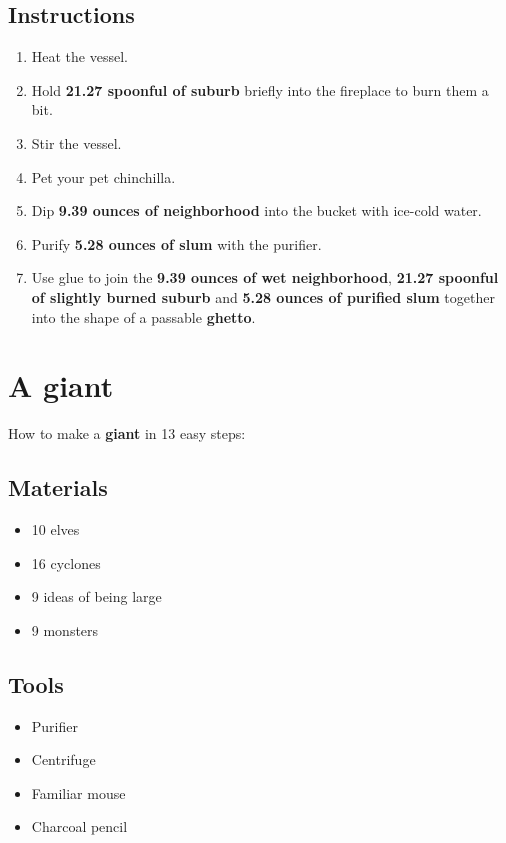 \documentclass{article}
\begin{document}
\subsection{Instructions}\begin{enumerate}
\item 
Heat the vessel.
\item 
Hold \textbf{21.27 spoonful of suburb} briefly into the fireplace to burn them a bit.
\item 
Stir the vessel.
\item 
Pet your pet chinchilla.
\item 
Dip \textbf{9.39 ounces of neighborhood} into the bucket with ice-cold water.
\item 
Purify \textbf{5.28 ounces of slum} with the purifier.
\item 
Use glue to join the \textbf{9.39 ounces of wet neighborhood}, \textbf{21.27 spoonful of slightly burned suburb} and \textbf{5.28 ounces of purified slum} together into the shape of a passable \textbf{ghetto}.
\end{enumerate}
\newpage
\section{A giant}How to make a \textbf{giant} in 13 easy steps:

\subsection{Materials}\begin{itemize}
\item 
10 elves
\item 
16 cyclones
\item 
9 ideas of being large
\item 
9 monsters
\end{itemize}
\subsection{Tools}\begin{itemize}
\item 
Purifier
\item 
Centrifuge
\item 
Familiar mouse
\item 
Charcoal pencil
\end{itemize}
\end{document}
